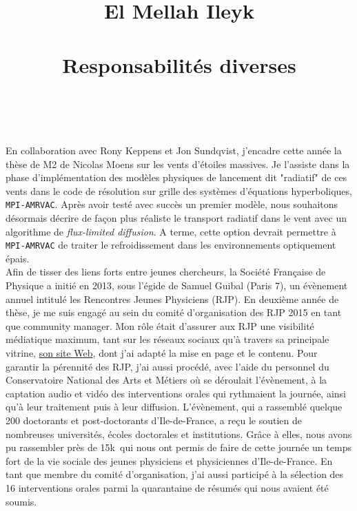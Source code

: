 \documentclass[paper=a4, fontsize=12pt,twoside]{scrartcl}
\title{	
\vspace*{-1cm}
\normalfont \normalsize 
El Mellah Ileyk \\ [25pt] %
\horrule{0.5pt} \\[0.4cm] %
\huge Responsabilit\'es diverses \\ %
\horrule{2pt} \\[0.5cm] %
}
\date{} %
\begin{document}
\maketitle
\thispagestyle{empty}

\vspace*{-2cm}

\indent En collaboration avec Rony Keppens et Jon Sundqvist, j'encadre cette ann\'ee la th\`ese de M2 de Nicolas Moens sur les vents d'\'etoiles massives. Je l'assiste dans la phase d'impl\'ementation des mod\`eles physiques de lancement dit "radiatif" de ces vents dans le code de r\'esolution sur grille des syst\`emes d'\'equations hyperboliques, \texttt{MPI-AMRVAC}. Apr\`es avoir test\'e avec succ\`es un premier mod\`ele, nous souhaitons d\'esormais d\'ecrire de fa\c con plus r\'ealiste le transport radiatif dans le vent avec un algorithme de \textit{flux-limited diffusion}. A terme, cette option devrait permettre \`a \texttt{MPI-AMRVAC} de traiter le refroidissement dans les environnements optiquement \'epais.\\

\indent Afin de tisser des liens forts entre jeunes chercheurs, la Soci\'et\'e Fran\c caise de Physique a initi\'e en 2013, sous l'\'egide de Samuel Guibal (Paris 7), un \'ev\`enement annuel intitul\'e les Rencontres Jeunes Physiciens (RJP). En deuxi\`eme ann\'ee de th\`ese, je me suis engag\'e au sein du comit\'e d'organisation des RJP 2015 en tant que community manager. Mon r\^ole \'etait d'assurer aux RJP une visibilit\'e m\'ediatique maximum, tant sur les r\'eseaux sociaux qu'\`a travers sa principale vitrine, \href{http://rjp.sfp-paris.fr/index2015.html}{son site Web}, dont j'ai adapt\'e la mise en page et le contenu. Pour garantir la p\'erennit\'e des RJP, j'ai aussi proc\'ed\'e, avec l'aide du personnel du Conservatoire National des Arts et M\'etiers o\`u se d\'eroulait l'\'ev\`enement, \`a la captation audio et vid\'eo des interventions orales qui rythmaient la journ\'ee, ainsi qu'\`a leur traitement puis \`a leur diffusion. L'\'ev\`enement, qui a rassembl\'e quelque 200 doctorants et post-doctorants d'Ile-de-France, a re\c cu le soutien de nombreuses universit\'es, \'ecoles doctorales et institutions. Gr\^ace \`a elles, nous avons pu rassembler pr\`es de 15k\texteuro\, qui nous ont permis de faire de cette journ\'ee un temps fort de la vie sociale des jeunes physiciens et physiciennes d'Ile-de-France. En tant que membre du comit\'e d'organisation, j'ai aussi particip\'e \`a la s\'election des 16 interventions orales parmi la quarantaine de r\'esum\'es qui nous avaient \'et\'e soumis.\\
\end{document}
